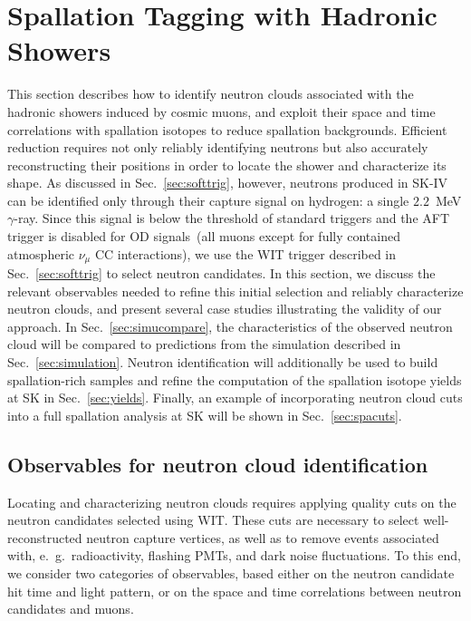 \section{Spallation Tagging with Hadronic Showers}
\label{sec:neutspall}
This section describes how to identify neutron clouds associated with the hadronic showers induced by cosmic muons, and exploit their space and time correlations with spallation isotopes to reduce spallation backgrounds. Efficient reduction requires not only reliably identifying neutrons but also accurately reconstructing their positions in order to locate the shower and characterize its shape. As discussed in Sec.~\ref{sec:softtrig}, however, neutrons produced in SK-IV can be identified only through their capture signal on hydrogen: a single $2.2$~MeV $\gamma$-ray. Since this signal is below the threshold of standard triggers and the AFT trigger is disabled for OD signals~(all muons except for fully contained atmospheric $\nu_{\mu}$ CC interactions), we use the WIT trigger described in Sec.~\ref{sec:softtrig} to select neutron candidates. In this section, we discuss the relevant observables needed to refine this initial selection and reliably characterize neutron clouds, and present several case studies illustrating the validity of our approach. In Sec.~\ref{sec:simucompare}, the characteristics of the observed neutron cloud will be compared to predictions from the simulation described in Sec.~\ref{sec:simulation}. Neutron identification will additionally be used to build spallation-rich samples and refine the computation of the spallation isotope yields at SK in Sec.~\ref{sec:yields}. Finally, an example of incorporating neutron cloud cuts into a full spallation analysis at SK will be shown in Sec.~\ref{sec:spacuts}.

\subsection{Observables for neutron cloud identification}
\label{sec:vardef}
Locating and characterizing neutron clouds requires applying quality cuts on the neutron candidates selected using WIT. These cuts are necessary to select well-reconstructed neutron capture vertices, as well as to remove events associated with, e.~g.~radioactivity, flashing PMTs, and dark noise fluctuations. To this end, we consider two categories of observables, based either on the neutron candidate hit time and light pattern, or on the space and time correlations between neutron candidates and muons. 

